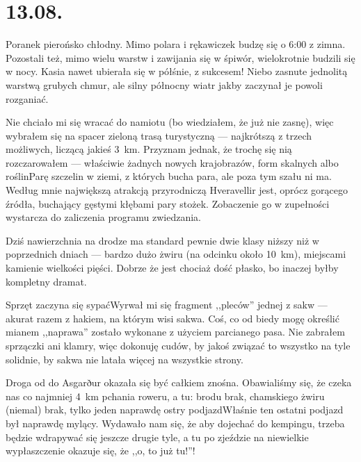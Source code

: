 \chapter*{13.08.}

Poranek pierońsko chłodny. Mimo polara i rękawiczek budzę się o 6:00 z zimna. Pozostali też, mimo wielu warstw i zawijania się w śpiwór, wielokrotnie budzili się w nocy. Kasia nawet ubierała się w półśnie, z sukcesem! Niebo zasnute jednolitą warstwą grubych chmur, ale silny północny wiatr jakby zaczynał je powoli rozganiać.

Nie chciało mi się wracać do namiotu (bo wiedziałem, że już nie zasnę), więc wybrałem się na spacer zieloną trasą turystyczną --- najkrótszą z trzech możliwych, liczącą jakieś 3~km. Przyznam jednak, że trochę się nią rozczarowałem --- właściwie żadnych nowych krajobrazów, form skalnych albo roślin\textellipsis Parę szczelin w ziemi, z których bucha para, ale poza tym szału ni ma. Według mnie największą atrakcją przyrodniczą Hveravellir jest, oprócz gorącego źródła, buchający gęstymi kłębami pary stożek. Zobaczenie go w zupełności wystarcza do zaliczenia programu zwiedzania.


Dziś nawierzchnia na drodze ma standard pewnie dwie klasy niższy niż w poprzednich dniach --- bardzo dużo żwiru (na odcinku około 10~km), miejscami kamienie wielkości pięści. Dobrze że jest chociaż dość płasko, bo inaczej byłby kompletny dramat.


Sprzęt zaczyna się sypać\textellipsis Wyrwał mi się fragment ,,pleców'' jednej z sakw --- akurat razem z hakiem, na którym wisi sakwa. Coś, co od biedy mogę określić mianem ,,naprawa'' zostało wykonane z użyciem parcianego pasa. Nie zabrałem sprzączki ani klamry, więc dokonuję cudów, by jakoś związać to wszystko na tyle solidnie, by sakwa nie latała więcej na wszystkie strony.

Droga od  do Asgarður okazała się być całkiem znośna. Obawialiśmy się, że czeka nas co najmniej 4~km pchania roweru, a tu: brodu brak, chamskiego żwiru (niemal) brak, tylko jeden naprawdę ostry podjazd\textellipsis Właśnie ten ostatni podjazd był naprawdę mylący. Wydawało nam się, że aby dojechać do kempingu, trzeba będzie wdrapywać się jeszcze drugie tyle, a tu po zjeździe na niewielkie wypłaszczenie okazuje się, że ,,o, to już tu!''!

